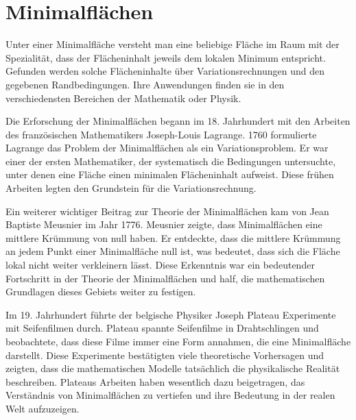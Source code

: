 %
%
%
%
\chapter{Minimalflächen\label{chapter:minimalflaechen}}
\begin{refsection}
	
	
	Unter einer Minimalfläche versteht man eine beliebige Fläche im Raum mit der Spezialität, dass der Flächeninhalt jeweils dem lokalen Minimum entspricht. 
	Gefunden werden solche Flächeninhalte über Variationsrechnungen und den gegebenen Randbedingungen. 
	Ihre Anwendungen finden sie in den verschiedensten Bereichen der Mathematik oder Physik.
	
	Die Erforschung der Minimalflächen begann im 18. Jahrhundert mit den Arbeiten des französischen Mathematikers Joseph-Louis Lagrange. 
	1760 formulierte Lagrange das Problem der Minimalflächen als ein Variationsproblem.
	Er war einer der ersten Mathematiker, der systematisch die Bedingungen untersuchte, unter denen eine Fläche einen minimalen Flächeninhalt aufweist. 
	Diese frühen Arbeiten legten den Grundstein für die Variationsrechnung.
	
	Ein weiterer wichtiger Beitrag zur Theorie der Minimalflächen kam von Jean Baptiste Meusnier im Jahr 1776. 
	Meusnier zeigte, dass Minimalflächen eine mittlere Krümmung von null haben.
	Er entdeckte, dass die mittlere Krümmung an jedem Punkt einer Minimalfläche null ist, was bedeutet, dass sich die Fläche lokal nicht weiter verkleinern lässt.
	Diese Erkenntnis war ein bedeutender Fortschritt in der Theorie der Minimalflächen und half, die mathematischen Grundlagen dieses Gebiets weiter zu festigen.
	
	Im 19. Jahrhundert führte der belgische Physiker Joseph Plateau Experimente mit Seifenfilmen durch.
	Plateau spannte Seifenfilme in Drahtschlingen und beobachtete, dass diese Filme immer eine Form annahmen, die eine Minimalfläche darstellt.
	Diese Experimente bestätigten viele theoretische Vorhersagen und zeigten, dass die mathematischen Modelle tatsächlich die physikalische Realität beschreiben.
	Plateaus Arbeiten haben wesentlich dazu beigetragen, das Verständnis von Minimalflächen zu vertiefen und ihre Bedeutung in der realen Welt aufzuzeigen.




\printbibliography[heading=subbibliography]
\end{refsection}
